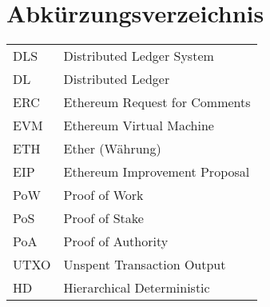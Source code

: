 
\section{Abkürzungsverzeichnis}

\begin{longtable}{p{6 cm}p{9 cm}}
    DLS & Distributed Ledger System \\
    DL & Distributed Ledger \\
    ERC & Ethereum Request for Comments \\
    EVM & Ethereum Virtual Machine \\
    ETH & Ether (Währung) \\
    EIP & Ethereum Improvement Proposal \\
    PoW & Proof of Work \\
    PoS & Proof of Stake \\
    PoA & Proof of Authority \\
    UTXO & Unspent Transaction Output \\
    HD & Hierarchical Deterministic \\
\end{longtable}

   